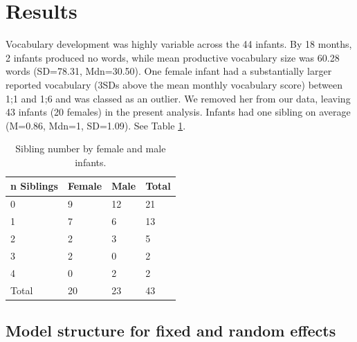\documentclass[
  man,floatsintext]{apa6}
\begin{document}
\hypertarget{results}{%
\section{Results}\label{results}}

Vocabulary development was highly variable across the 44 infants. By 18 months, 2 infants produced no words, while mean productive vocabulary size was 60.28 words (SD=78.31, Mdn=30.50). One female infant had a substantially larger reported vocabulary (3SDs above the mean monthly vocabulary score) between 1;1 and 1;6 and was classed as an outlier. We removed her from our data, leaving 43 infants (20 females) in the present analysis. Infants had one sibling on average (M=0.86, Mdn=1, SD=1.09). See Table \ref{tab:table-sibling-number}.

\begin{table}[tbp]

\begin{center}
\begin{threeparttable}

\caption{\label{tab:table-sibling-number}Sibling number by female and male infants.}

\small{

\begin{tabular}{llll}
\toprule
n Siblings & \multicolumn{1}{c}{Female} & \multicolumn{1}{c}{Male} & \multicolumn{1}{c}{Total}\\
\midrule
0 & 9 & 12 & 21\\
1 & 7 & 6 & 13\\
2 & 2 & 3 & 5\\
3 & 2 & 0 & 2\\
4 & 0 & 2 & 2\\
Total & 20 & 23 & 43\\
\bottomrule
\end{tabular}

}

\end{threeparttable}
\end{center}

\end{table}

\hypertarget{model-structure-for-fixed-and-random-effects}{%
\subsection{Model structure for fixed and random effects}\label{model-structure-for-fixed-and-random-effects}}
\end{document}
